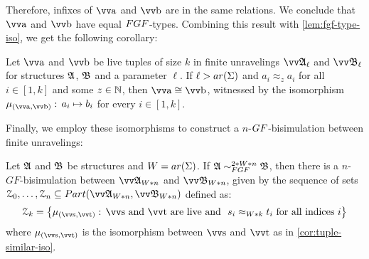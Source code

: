 Therefore, infixes of $\elemtuptuplea$ and $\elemtuptupleb$ are in the same relations.
We conclude that $\elemtuptuplea$ and $\elemtuptupleb$ have equal $\FGF$-types.
Combining this result with \cref{lem:fgf-type-iso}, we get the following corollary:
\begin{corollary}\label{cor:tuple-similar-iso}
  Let $\elemtuptuplea$ and $\elemtuptupleb$ be live tuples of size $k$ in finite unravelings $\unravel{A}_{\ell}$ and $\unravel{B}_{\ell}$ for structures ${\mathfrak{A}}$, ${\mathfrak{B}}$ and a parameter $\ell$.
  If $\ell > \arity(\Sigma)$ and $a_{i} \approx_{z} a_{i}$ for all $i \in [1,k]$ and some $z \in {\mathbb{N}}$, then $\elemtuptuplea \isoeq \elemtuptupleb$, witnessed by the isomorphism $\mu_{(\elemtuptuplea, \elemtuptupleb)}:\, a_{i} \mapsto b_{i}$ for every $i \in [1, k]$.
\end{corollary}
Finally, we employ these isomorphisms to construct a $n$-$\GF$-bisimulation between finite unravelings:
\begin{lemma}
  Let ${\mathfrak{A}}$ and ${\mathfrak{B}}$ be structures and $W = \arity(\Sigma)$.
  If $\str{A} \bisimto_{\FGF}^{2 * W * n} \str{B}$, then there is a $n$-$GF$-bisimulation between $\unravel{A}_{W * n}$ and $\unravel{B}_{W * n}$, given by the sequence of sets $\bisimZ_{0}, \ldots, \bisimZ_{n} \subseteq \PartIso{\unravel{A}_{W * n}}{\unravel{B}_{W * n}}$ defined as:
  \begin{equation*}
    \bisimZ_{k} = \left\{
      \mu_{(\elemtuptuples, \elemtuptuplet)}:\,
      \elemtuptuples\ \text{and}\ \elemtuptuplet\ \text{are live and}\ \
      s_{i} \approx_{W * k} t_{i}\ \text{for all indices $i$}
    \right\}
  \end{equation*}
  where $\mu_{(\elemtuptuples, \elemtuptuplet)}$ is the isomorphism between $\elemtuptuples$ and $\elemtuptuplet$ as in \cref{cor:tuple-similar-iso}.
\end{lemma}

